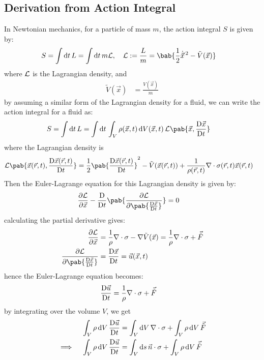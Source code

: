 \subsection{Derivation from Action Integral}
In Newtonian mechanics, for a particle of mass $m$, the action integral $S$ is given by:
\begin{align}
  S & = \int \odif{t} \, L = \int \odif{t} \, m \lagr, \quad \lagr := \frac{L}{m} = \bab{\frac{1}{2} \dot{\vec{x}}^{\, 2} - \tilde{V}(\vec{x})}
\end{align}
where $\mathcal{L}$ is the Lagrangian density, and
\begin{align}
  \tilde{V}(\vec{x}) & = \frac{V(\vec{x})}{m}
\end{align}
by assuming a similar form of the Lagrangian density for a fluid, we can write the action integral for a fluid as:
\begin{align}
  S & = \int \odif{t} \, L = \int \odif{t} \, \int_V \rho(\vec{x}, t) \odif{V}(\vec{x}, t) \, \lagr\pab{\vec{x}, \mdv{\vec{x}}{t}}
\end{align}
where the Lagrangian density is
\begin{align}
  \lagr \pab{\vec{x}(\vec{r}, t), \mdv{\vec{x}(\vec{r}, t)}{t}} & = \frac{1}{2} \pab{\mdv{\vec{x}(\vec{r}, t)}{t}}^2 - \tilde{V}(\vec{x}(\vec{r}, t)) + \frac{1}{\rho(\vec{r}, t)} \nabla \cdot \sigma(\vec{r}, t) \vec{x}(\vec{r}, t)
\end{align}
Then the Euler-Lagrange equation for this Lagrangian density is given by:
\begin{align}
  \pdv{\lagr}{\vec{x}} - \mdv{}{t} \pab{\pdv{\lagr}{\pab{\mdv{\vec{x}}{t}}}} & = 0
\end{align}
calculating the partial derivative gives:
\begin{align}
  \pdv{\lagr}{\vec{x}}                & = \frac{1}{\rho} \nabla \cdot \sigma - \nabla \tilde{V}(\vec{x}) = \frac{1}{\rho} \nabla \cdot \sigma + \vec{\tilde{F}} \\
  \pdv{\lagr}{\pab{\mdv{\vec{x}}{t}}} & = \mdv{\vec{x}}{t} = \vec{u}(\vec{x}, t)
\end{align}
hence the Euler-Lagrange equation becomes:
\begin{align}
  \mdv{\vec{u}}{t} & = \frac{1}{\rho} \nabla \cdot \sigma + \vec{\tilde{F}}
\end{align}
by integrating over the volume $V$, we get
\begin{align}
  \int_V \rho \odif{V} \, \mdv{\vec{u}}{t}                & = \int_V \odif{V} \, \nabla \cdot \sigma + \int_V \rho \odif{V} \, \vec{\tilde{F}}  \\
  \implies \quad \int_V \rho \odif{V} \, \mdv{\vec{u}}{t} & = \int_V \odif{s} \, \vec{n} \cdot \sigma + \int_V \rho \odif{V} \, \vec{\tilde{F}}
\end{align}



